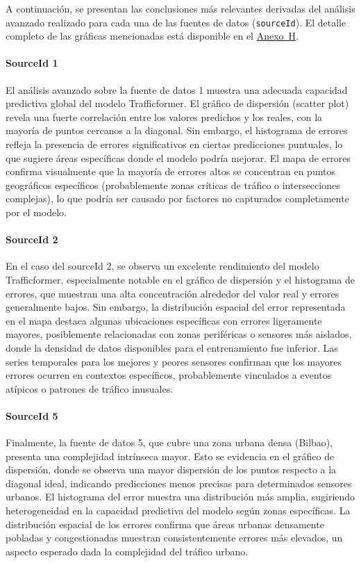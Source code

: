 A continuación, se presentan las conclusiones más relevantes derivadas del análisis avanzado realizado para cada una de las fuentes de datos (\texttt{sourceId}). El detalle completo de las gráficas mencionadas está disponible en el \hyperref[anexo:analisis_avanzado]{Anexo~H}.

\paragraph{SourceId 1}
El análisis avanzado sobre la fuente de datos 1 muestra una adecuada capacidad predictiva global del modelo Trafficformer. El gráfico de dispersión (scatter plot) revela una fuerte correlación entre los valores predichos y los reales, con la mayoría de puntos cercanos a la diagonal. Sin embargo, el histograma de errores refleja la presencia de errores significativos en ciertas predicciones puntuales, lo que sugiere áreas específicas donde el modelo podría mejorar. El mapa de errores confirma visualmente que la mayoría de errores altos se concentran en puntos geográficos específicos (probablemente zonas críticas de tráfico o intersecciones complejas), lo que podría ser causado por factores no capturados completamente por el modelo.

\paragraph{SourceId 2}
En el caso del sourceId 2, se observa un excelente rendimiento del modelo Trafficformer, especialmente notable en el gráfico de dispersión y el histograma de errores, que muestran una alta concentración alrededor del valor real y errores generalmente bajos. Sin embargo, la distribución espacial del error representada en el mapa destaca algunas ubicaciones específicas con errores ligeramente mayores, posiblemente relacionadas con zonas periféricas o sensores más aislados, donde la densidad de datos disponibles para el entrenamiento fue inferior. Las series temporales para los mejores y peores sensores confirman que los mayores errores ocurren en contextos específicos, probablemente vinculados a eventos atípicos o patrones de tráfico inusuales.

\paragraph{SourceId 5}
Finalmente, la fuente de datos 5, que cubre una zona urbana densa (Bilbao), presenta una complejidad intrínseca mayor. Esto se evidencia en el gráfico de dispersión, donde se observa una mayor dispersión de los puntos respecto a la diagonal ideal, indicando predicciones menos precisas para determinados sensores urbanos. El histograma del error muestra una distribución más amplia, sugiriendo heterogeneidad en la capacidad predictiva del modelo según zonas específicas. La distribución espacial de los errores confirma que áreas urbanas densamente pobladas y congestionadas muestran consistentemente errores más elevados, un aspecto esperado dada la complejidad del tráfico urbano.

